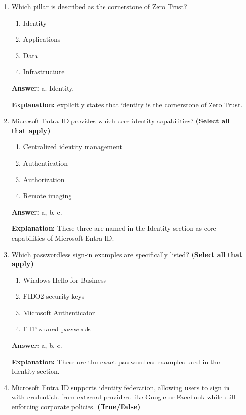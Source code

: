 \documentclass[10pt]{article}
\begin{document}
\begin{enumerate}[leftmargin=*]
\textbf{Explanation:} these six pillars as the domains where Zero Trust principles must be applied.

\item Which pillar is described as the cornerstone of Zero Trust?
\begin{enumerate}[label=\alph*., leftmargin=1.5em]
\item Identity
\item Applications
\item Data
\item Infrastructure
\end{enumerate}
\textbf{Answer:} a. Identity.

\textbf{Explanation:} explicitly states that identity is the cornerstone of Zero Trust.

\item Microsoft Entra ID provides which core identity capabilities? \textbf{(Select all that apply)}
\begin{enumerate}[label=\alph*., leftmargin=1.5em]
\item Centralized identity management
\item Authentication
\item Authorization
\item Remote imaging
\end{enumerate}
\textbf{Answer:} a, b, c.

\textbf{Explanation:} These three are named in the Identity section as core capabilities of Microsoft Entra ID.

\item Which passwordless sign-in examples are specifically listed? \textbf{(Select all that apply)}
\begin{enumerate}[label=\alph*., leftmargin=1.5em]
\item Windows Hello for Business
\item FIDO2 security keys
\item Microsoft Authenticator
\item FTP shared passwords
\end{enumerate}
\textbf{Answer:} a, b, c.

\textbf{Explanation:} These are the exact passwordless examples used in the Identity section.

\item Microsoft Entra ID supports identity federation, allowing users to sign in with credentials from external providers like Google or Facebook while still enforcing corporate policies. \textbf{(True/False)}


\end{enumerate}
\end{document}
